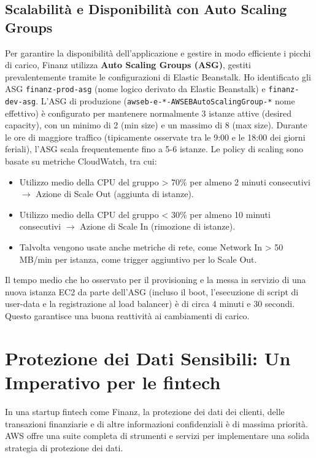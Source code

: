 \subsection{Scalabilità e Disponibilità con Auto Scaling Groups}
\label{subsec:auto-scaling_cap2}
Per garantire la disponibilità dell'applicazione e gestire in modo efficiente i picchi di carico, Finanz utilizza \textbf{Auto Scaling Groups (ASG)}, gestiti prevalentemente tramite le configurazioni di Elastic Beanstalk. Ho identificato gli ASG \texttt{finanz-prod-asg} (nome logico derivato da Elastic Beanstalk) e \texttt{finanz-dev-asg}.
L'ASG di produzione (\texttt{awseb-e-*-AWSEBAutoScalingGroup-*} nome effettivo) è configurato per mantenere normalmente 3 istanze attive (desired capacity), con un minimo di 2 (min size) e un massimo di 8 (max size). Durante le ore di maggiore traffico (tipicamente osservate tra le 9:00 e le 18:00 dei giorni feriali), l'ASG scala frequentemente fino a 5-6 istanze. Le policy di scaling sono basate su metriche CloudWatch, tra cui:
\begin{itemize}
    \item Utilizzo medio della CPU del gruppo > 70\% per almeno 2 minuti consecutivi $\rightarrow$ Azione di Scale Out (aggiunta di istanze).
    \item Utilizzo medio della CPU del gruppo < 30\% per almeno 10 minuti consecutivi $\rightarrow$ Azione di Scale In (rimozione di istanze).
    \item Talvolta vengono usate anche metriche di rete, come Network In > 50 MB/min per istanza, come trigger aggiuntivo per lo Scale Out.
\end{itemize}
Il tempo medio che ho osservato per il provisioning e la messa in servizio di una nuova istanza EC2 da parte dell'ASG (incluso il boot, l'esecuzione di script di user-data e la registrazione al load balancer) è di circa 4 minuti e 30 secondi. Questo garantisce una buona reattività ai cambiamenti di carico.

\section{Protezione dei Dati Sensibili: Un Imperativo per le fintech}
\label{sec:data-protection_cap2}
In una startup fintech come Finanz, la protezione dei dati dei clienti, delle transazioni finanziarie e di altre informazioni confidenziali è di massima priorità. AWS offre una suite completa di strumenti e servizi per implementare una solida strategia di protezione dei dati.

